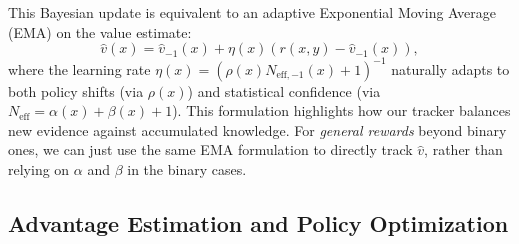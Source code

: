 This Bayesian update is equivalent to an adaptive Exponential Moving Average (EMA) on the value estimate:
\begin{equation}\hat{v}(x) = \hat{v}_{-1}(x) + \eta(x) (r(x, y) - \hat{v}_{-1}(x)),
\end{equation} 
where the learning rate $\eta(x) = (\rho(x) N_{\text{eff},-1}(x) + 1)^{-1}$ naturally adapts to both policy shifts (via $\rho(x)$) and statistical confidence (via $N_\text{eff} = \alpha(x) + \beta(x) + 1$). This formulation highlights how our tracker balances new evidence against accumulated knowledge. For \emph{general rewards} beyond binary ones, we can just use the same EMA formulation to directly track $\hat{v}$, rather than relying on $\alpha$ and $\beta$ in the binary cases.

\subsection{Advantage Estimation and Policy Optimization}

